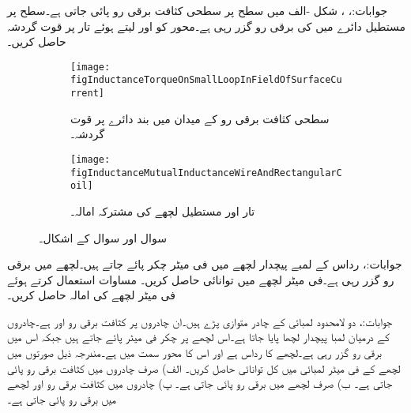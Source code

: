 جوابات:، ، 
شکل -الف میں  سطح پر سطحی کثافت برقی رو  پائی جاتی ہے۔سطح  پر مستطیل دائرے میں  کی برقی رو گزر رہی ہے۔محور کو  اور  لیتے ہوئے تار پر قوت گردشہ حاصل کریں۔
\begin{figure}
\centering
\begin{subfigure}{0.5\textwidth}
\centering
\texttt{[image: figInductanceTorqueOnSmallLoopInFieldOfSurfaceCurrent]}
\caption{سطحی کثافت برقی رو کے میدان میں بند دائرے پر قوت گردشہ۔}
\end{subfigure}%
%
\begin{subfigure}{0.5\textwidth}
\centering
\texttt{[image: figInductanceMutualInductanceWireAndRectangularCoil]}
\caption{تار اور مستطیل لچھے کی مشترکہ امالہ۔}
\end{subfigure}%
\caption{سوال  اور سوال  کے اشکال۔}
\label{شکل_امالہ_سوالات_سطحی_میدان_اور_دائرہ}
\end{figure}

جوابات:، 
رداس  کے لمبے پیچدار لچھے میں فی میٹر  چکر پائے جاتے ہیں۔لچھے میں  برقی رو گزر رہی ہے۔فی میٹر لچھے میں توانائی  حاصل کریں۔ مساوات  استعمال کرتے ہوئے فی میٹر لچھے کی امالہ حاصل کریں۔

جوابات:، 
دو لامحدود لمبائی کے چادر متوازی پڑے ہیں۔ان چادروں پر کثافت برقی رو  اور 
 ہے۔چادروں کے درمیان لمبا پیچدار لچھا پایا جاتا ہے۔اس لچھے پر  چکر فی میٹر پائے جاتے ہیں جبکہ اس میں  برقی رو گزر رہی ہے۔لچھے کا رداس  ہے اور اس کا محور  سمت میں ہے۔مندرجہ ذیل صورتوں میں لچھے کے فی میٹر لمبائی میں کل توانائی حاصل کریں۔ الف) صرف چادروں میں کثافت برقی رو پائی جاتی ہے۔ ب) صرف لچھے میں برقی رو پائی جاتی ہے۔ پ) چادروں میں کثافت برقی رو اور لچھے میں برقی رو پائی جاتی ہے۔

